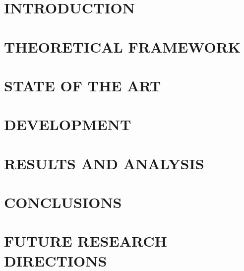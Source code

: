\documentclass[12pt]{article}
\begin{document}
\clearpage %
\section{INTRODUCTION}



\clearpage



\newpage
\section{THEORETICAL FRAMEWORK}
    

\newpage
\section{STATE OF THE ART}
    

\newpage
\section{DEVELOPMENT}
    

\newpage
\section{RESULTS AND ANALYSIS}
    


\newpage
\section{CONCLUSIONS}
    

\newpage
\section{FUTURE RESEARCH DIRECTIONS}
    

\newpage

\printbibliography[title={REFERENCES}, heading=bibintoc]
\end{document}

